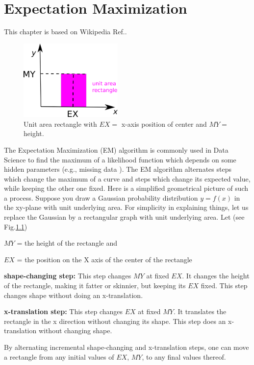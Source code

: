 \chapter{Expectation Maximization}

This chapter is based on Wikipedia 
Ref.\cite{wiki-em}.

\begin{figure}[h!]
\centering
\includegraphics[width=2in]
{emax/emax-square.png}
\caption{Unit area rectangle
with $EX=$ x-axis position 
of center
and $MY=$ height.} 
\label{fig-emax-square}
\end{figure}

The Expectation Maximization (EM) 
algorithm 
is commonly used in Data Science 
to find the maximum of a
 likelihood function which 
depends on some hidden parameters
 (e.g., missing data ). 
The EM algorithm alternates
 steps which change  
the maximum of a curve and 
steps which change its expected
 value, while  keeping the other 
one fixed. Here is a simplified
 geometrical picture of such a process. 
Suppose you draw a Gaussian probability
 distribution $y=f(x)$ in the xy-plane 
with unit underlying area. For simplicity
 in explaining things, let us replace 
the Gaussian by a rectangular 
graph with unit underlying area. Let 
(see Fig.\ref{fig-emax-square})

$MY$ = the height of the rectangle and

$EX$ = the position on the X axis of the 
center of the rectangle

{\bf shape-changing step:} This step 
changes $MY$ at fixed $EX$. 
It changes the height of the rectangle,
 making it fatter or skinnier, 
 but keeping its $EX$ fixed. 
 This step changes shape without
 doing an x-translation.

{\bf x-translation step:} This step changes 
$EX$ at fixed $MY$. It  translates 
the rectangle in the x direction 
without changing its shape. This step
 does an x-translation without changing shape.

By alternating 
incremental shape-changing and 
x-translation steps, one can
 move a rectangle from any 
initial values of $EX$, $MY$, 
to any final values thereof.


